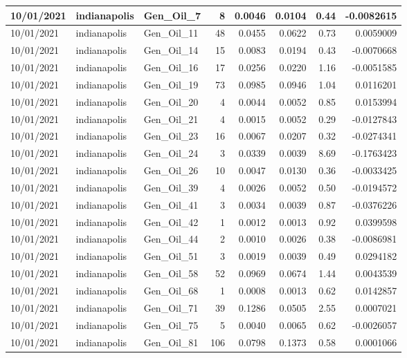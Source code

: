 \documentclass[
  letterpaper,
  DIV=11,
  numbers=noendperiod]{scrartcl}
\begin{document}
\begin{tabular}{l|l|l|r|r|r|r|r}
\hline
10/01/2021 & indianapolis & Gen\_Oil\_7 & 8 & 0.0046 & 0.0104 & 0.44 & -0.0082615\\
\hline
10/01/2021 & indianapolis & Gen\_Oil\_11 & 48 & 0.0455 & 0.0622 & 0.73 & 0.0059009\\
\hline
10/01/2021 & indianapolis & Gen\_Oil\_14 & 15 & 0.0083 & 0.0194 & 0.43 & -0.0070668\\
\hline
10/01/2021 & indianapolis & Gen\_Oil\_16 & 17 & 0.0256 & 0.0220 & 1.16 & -0.0051585\\
\hline
10/01/2021 & indianapolis & Gen\_Oil\_19 & 73 & 0.0985 & 0.0946 & 1.04 & 0.0116201\\
\hline
10/01/2021 & indianapolis & Gen\_Oil\_20 & 4 & 0.0044 & 0.0052 & 0.85 & 0.0153994\\
\hline
10/01/2021 & indianapolis & Gen\_Oil\_21 & 4 & 0.0015 & 0.0052 & 0.29 & -0.0127843\\
\hline
10/01/2021 & indianapolis & Gen\_Oil\_23 & 16 & 0.0067 & 0.0207 & 0.32 & -0.0274341\\
\hline
10/01/2021 & indianapolis & Gen\_Oil\_24 & 3 & 0.0339 & 0.0039 & 8.69 & -0.1763423\\
\hline
10/01/2021 & indianapolis & Gen\_Oil\_26 & 10 & 0.0047 & 0.0130 & 0.36 & -0.0033425\\
\hline
10/01/2021 & indianapolis & Gen\_Oil\_39 & 4 & 0.0026 & 0.0052 & 0.50 & -0.0194572\\
\hline
10/01/2021 & indianapolis & Gen\_Oil\_41 & 3 & 0.0034 & 0.0039 & 0.87 & -0.0376226\\
\hline
10/01/2021 & indianapolis & Gen\_Oil\_42 & 1 & 0.0012 & 0.0013 & 0.92 & 0.0399598\\
\hline
10/01/2021 & indianapolis & Gen\_Oil\_44 & 2 & 0.0010 & 0.0026 & 0.38 & -0.0086981\\
\hline
10/01/2021 & indianapolis & Gen\_Oil\_51 & 3 & 0.0019 & 0.0039 & 0.49 & 0.0294182\\
\hline
10/01/2021 & indianapolis & Gen\_Oil\_58 & 52 & 0.0969 & 0.0674 & 1.44 & 0.0043539\\
\hline
10/01/2021 & indianapolis & Gen\_Oil\_68 & 1 & 0.0008 & 0.0013 & 0.62 & 0.0142857\\
\hline
10/01/2021 & indianapolis & Gen\_Oil\_71 & 39 & 0.1286 & 0.0505 & 2.55 & 0.0007021\\
\hline
10/01/2021 & indianapolis & Gen\_Oil\_75 & 5 & 0.0040 & 0.0065 & 0.62 & -0.0026057\\
\hline
10/01/2021 & indianapolis & Gen\_Oil\_81 & 106 & 0.0798 & 0.1373 & 0.58 & 0.0001066\\

\end{tabular}
\end{document}
